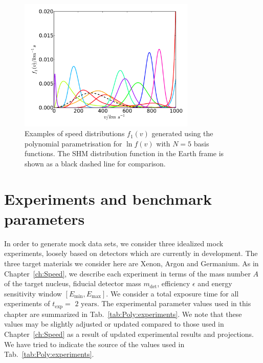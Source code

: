 \begin{figure}[h]
\centering
  \includegraphics[width=0.75\textwidth]{Poly/Poly.pdf}
  \caption[Examples of $\ln f(v)$ polynomial distributions]{Examples of speed distributions $f_1(v)$ generated using the polynomial parametrisation for $\ln f(v)$ with $N=5$ basis functions. The SHM distribution function in the Earth frame is shown as a black dashed line for comparison.}
  \label{fig:Poly:examples}
\end{figure}


\section{Experiments and benchmark parameters}
\label{sec:Poly:experiments}

In order to generate mock data sets, we consider three idealized mock experiments, loosely based on detectors which are currently in development. The three target materials we consider here are Xenon, Argon and Germanium. As in Chapter~\ref{ch:Speed}, we describe each experiment in terms of the mass number $A$ of the target nucleus, fiducial detector mass $m_\textrm{det}$, efficiency $\epsilon$ and energy sensitivity window $\left[E_\textrm{min}, E_\textrm{max}\right]$. We consider a total exposure time for all experiments of $t_\textrm{exp} = \textrm{ 2 years}$. The experimental parameter values used in this chapter are summarized in Tab.~\ref{tab:Poly:experiments}. We note that these values may be slightly adjusted or updated compared to those used in Chapter~\ref{ch:Speed} as a result of updated experimental results and projections. We have tried to indicate the source of the values used in Tab.~\ref{tab:Poly:experiments}.

